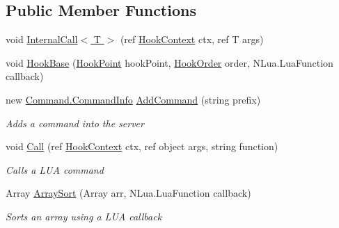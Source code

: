 \subsection*{Public Member Functions}
\begin{DoxyCompactItemize}
\item 
void \hyperlink{class_o_t_a_1_1_plugin_1_1_l_u_a_plugin_a43260158f57d1e46d1ec85320f27a5d7}{Internal\+Call$<$ T $>$} (ref \hyperlink{struct_o_t_a_1_1_plugin_1_1_hook_context}{Hook\+Context} ctx, ref T args)
\item 
void \hyperlink{class_o_t_a_1_1_plugin_1_1_l_u_a_plugin_ab002ee608c74b761e9357e6a2f85d508}{Hook\+Base} (\hyperlink{class_o_t_a_1_1_plugin_1_1_hook_point}{Hook\+Point} hook\+Point, \hyperlink{namespace_o_t_a_1_1_plugin_a1030f4a1f490e336a706685a767f6874}{Hook\+Order} order, N\+Lua.\+Lua\+Function callback)
\item 
new \hyperlink{class_o_t_a_1_1_command_1_1_command_info}{Command.\+Command\+Info} \hyperlink{class_o_t_a_1_1_plugin_1_1_l_u_a_plugin_aa79c2465b45707ca2058dac2d7642c4d}{Add\+Command} (string prefix)
\begin{DoxyCompactList}\small\item\em Adds a command into the server \end{DoxyCompactList}\item 
void \hyperlink{class_o_t_a_1_1_plugin_1_1_l_u_a_plugin_aa3d7efa3b58b9bfef821197b840eb9c0}{Call} (ref \hyperlink{struct_o_t_a_1_1_plugin_1_1_hook_context}{Hook\+Context} ctx, ref object args, string function)
\begin{DoxyCompactList}\small\item\em Calls a L\+U\+A command \end{DoxyCompactList}\item 
Array \hyperlink{class_o_t_a_1_1_plugin_1_1_l_u_a_plugin_a699e916cd5ff16c5da4d8e7819124e67}{Array\+Sort} (Array arr, N\+Lua.\+Lua\+Function callback)
\begin{DoxyCompactList}\small\item\em Sorts an array using a L\+U\+A callback \end{DoxyCompactList}\end{DoxyCompactItemize}
